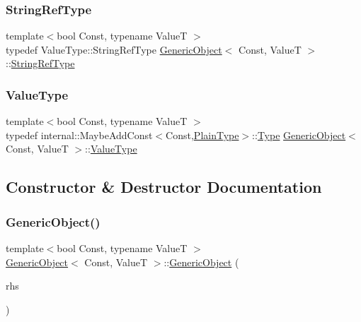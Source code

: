 \mbox{\label{classGenericObject_a9b8381fc96f5f89b2163b052ed66cc59}} 
\subsubsection{\texorpdfstring{String\+Ref\+Type}{StringRefType}}
{\footnotesize\ttfamily template$<$bool Const, typename ValueT $>$ \\
typedef Value\+Type\+::\+String\+Ref\+Type \hyperlink{classGenericObject}{Generic\+Object}$<$ Const, ValueT $>$\+::\hyperlink{classGenericObject_a9b8381fc96f5f89b2163b052ed66cc59}{String\+Ref\+Type}}

\mbox{\label{classGenericObject_a930aa30f89caee7ba7bff60bf9dc21b1}} 
\subsubsection{\texorpdfstring{Value\+Type}{ValueType}}
{\footnotesize\ttfamily template$<$bool Const, typename ValueT $>$ \\
typedef internal\+::\+Maybe\+Add\+Const$<$Const,\hyperlink{classGenericObject_a4c25f4a5f696745c418b91ad9f577f12}{Plain\+Type}$>$\+::\hyperlink{rapidjson_8h_a1d1cfd8ffb84e947f82999c682b666a7}{Type} \hyperlink{classGenericObject}{Generic\+Object}$<$ Const, ValueT $>$\+::\hyperlink{classGenericObject_a930aa30f89caee7ba7bff60bf9dc21b1}{Value\+Type}}



\subsection{Constructor \& Destructor Documentation}
\mbox{\label{classGenericObject_a10173c42d0e8a71ca0e3ae75d800887a}} 
\subsubsection{\texorpdfstring{Generic\+Object()}{GenericObject()}\hspace{0.1cm}{\footnotesize\ttfamily [1/3]}}
{\footnotesize\ttfamily template$<$bool Const, typename ValueT $>$ \\
\hyperlink{classGenericObject}{Generic\+Object}$<$ Const, ValueT $>$\+::\hyperlink{classGenericObject}{Generic\+Object} (\begin{DoxyParamCaption}\item[{\hyperlink{classGenericObject_af70c9646b5e422306c33e98b3d8783a7}{const} \hyperlink{classGenericObject}{Generic\+Object}$<$ Const, ValueT $>$ \&}]{rhs }\end{DoxyParamCaption})\hspace{0.3cm}{\ttfamily [inline]}}

